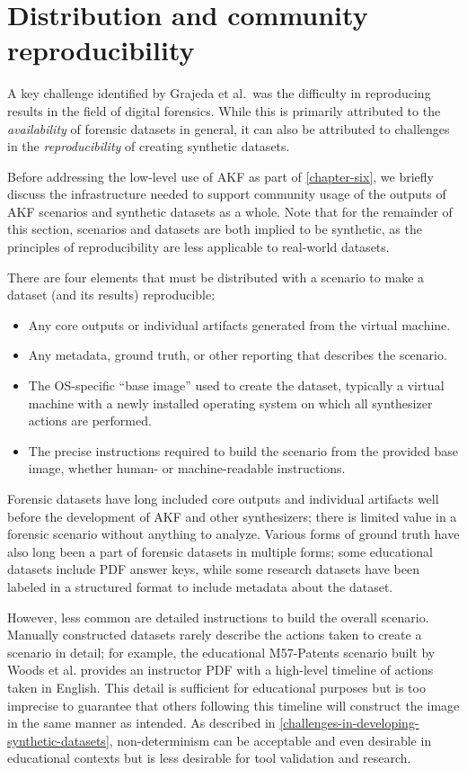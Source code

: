 \documentclass[letterpaper,12pt]{report}
\def\tightlist{}
\begin{document}
\section{Distribution and community
reproducibility}\label{distribution-and-community-reproducibility}

A key challenge identified by Grajeda et al.~was the difficulty in
reproducing results in the field of digital forensics. While this is
primarily attributed to the \emph{availability} of forensic datasets in
general, it can also be attributed to challenges in the
\emph{reproducibility} of creating synthetic datasets.

Before addressing the low-level use of AKF as part of \autoref{chapter-six}, we briefly discuss the infrastructure needed to
support community usage of the outputs of AKF scenarios and synthetic
datasets as a whole. Note that for the remainder of this section,
scenarios and datasets are both implied to be synthetic, as the
principles of reproducibility are less applicable to real-world
datasets.

There are four elements that must be distributed with a scenario to make
a dataset (and its results) reproducible:

\begin{itemize}
\tightlist
\item
  Any core outputs or individual artifacts generated from the virtual
  machine.
\item
  Any metadata, ground truth, or other reporting that describes the
  scenario.
\item
  The OS-specific ``base image'' used to create the dataset, typically a
  virtual machine with a newly installed operating system on which all
  synthesizer actions are performed.
\item
  The precise instructions required to build the scenario from the
  provided base image, whether human- or machine-readable instructions.
\end{itemize}

Forensic datasets have long included core outputs and individual
artifacts well before the development of AKF and other synthesizers;
there is limited value in a forensic scenario without anything to
analyze. Various forms of ground truth have also long been a part of
forensic datasets in multiple forms; some educational datasets include
PDF answer keys, while some research datasets have been labeled in a
structured format to include metadata about the dataset.

However, less common are detailed instructions to build the overall
scenario. Manually constructed datasets rarely describe the actions
taken to create a scenario in detail; for example, the educational
M57-Patents scenario built by Woods et al.
\cite{woodsCreatingRealisticCorpora2011} provides an instructor PDF
with a high-level timeline of actions taken in English. This detail is
sufficient for educational purposes but is too imprecise to guarantee
that others following this timeline will construct the image in the same
manner as intended. As described in \autoref{challenges-in-developing-synthetic-datasets}, non-determinism can be
acceptable and even desirable in educational contexts but is less
desirable for tool validation and research.
\end{document}
